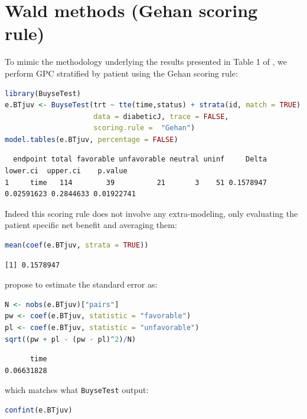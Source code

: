 \documentclass[12pt]{article}
\begin{document}
\clearpage
\section{Wald methods (Gehan scoring rule)}
\label{sec:org35a98d4}

To mimic the methodology underlying the results presented in Table 1
of \cite{matsouaka2022robust}, we perform GPC stratified by patient
using the Gehan scoring rule:
\begin{lstlisting}[language=r,numbers=none]
library(BuyseTest)
e.BTjuv <- BuyseTest(trt ~ tte(time,status) + strata(id, match = TRUE), 
                     data = diabeticJ, trace = FALSE,
                     scoring.rule =  "Gehan")
model.tables(e.BTjuv, percentage = FALSE)
\end{lstlisting}

\label{}
\begin{verbatim}
  endpoint total favorable unfavorable neutral uninf     Delta   lower.ci  upper.ci    p.value
1     time   114        39          21       3    51 0.1578947 0.02591623 0.2844633 0.01922741
\end{verbatim}


Indeed this scoring rule does not involve any extra-modeling, only
evaluating the patient specific net benefit and averaging them:
\begin{lstlisting}[language=r,numbers=none]
mean(coef(e.BTjuv, strata = TRUE))
\end{lstlisting}

\label{}
\begin{verbatim}
[1] 0.1578947
\end{verbatim}


\cite{matsouaka2022robust} propose to estimate the standard error as:
\begin{lstlisting}[language=r,numbers=none]
N <- nobs(e.BTjuv)["pairs"]
pw <- coef(e.BTjuv, statistic = "favorable")
pl <- coef(e.BTjuv, statistic = "unfavorable")
sqrt((pw + pl - (pw - pl)^2)/N)
\end{lstlisting}

\label{}
\begin{verbatim}
      time 
0.06631828
\end{verbatim}


which matches what \texttt{BuyseTest} output:
\begin{lstlisting}[language=r,numbers=none]
confint(e.BTjuv)
\end{lstlisting}
\end{document}
